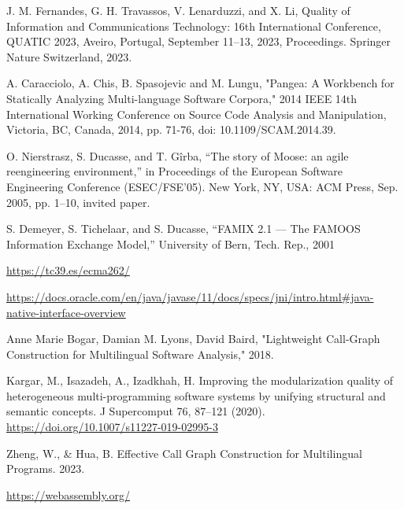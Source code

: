\begin{thebibliography}{00}
    J. M. Fernandes, G. H. Travassos, V. Lenarduzzi, and X. Li, 
    Quality of Information and Communications Technology: 
    16th International Conference, QUATIC 2023,
    Aveiro, Portugal, September 11--13, 2023,
    Proceedings. Springer Nature Switzerland, 2023.

    A. Caracciolo, A. Chis, B. Spasojevic and
    M. Lungu, "Pangea: A Workbench for Statically Analyzing Multi-language Software Corpora,"
    2014 IEEE 14th International Working Conference on Source Code Analysis
    and Manipulation, Victoria, BC, Canada, 2014,
    pp. 71-76, doi: 10.1109/SCAM.2014.39.

    O. Nierstrasz, S. Ducasse, and T. Gîrba, “The story of Moose: an
    agile reengineering environment,” in Proceedings of the European
    Software Engineering Conference (ESEC/FSE’05). New York, NY,
    USA: ACM Press, Sep. 2005, pp. 1–10, invited paper.

    S. Demeyer, S. Tichelaar, and S. Ducasse, “FAMIX 2.1 — The FAMOOS
    Information Exchange Model,” University of Bern, Tech. Rep., 2001

    \url{https://tc39.es/ecma262/}

    \url{https://docs.oracle.com/en/java/javase/11/docs/specs/jni/intro.html#java-native-interface-overview}

    Anne Marie Bogar, Damian M. Lyons, David Baird,
    "Lightweight Call-Graph Construction for Multilingual Software Analysis," 2018.

    Kargar, M., Isazadeh, A., Izadkhah, H.
    Improving the modularization quality of heterogeneous multi-programming software systems by unifying structural and semantic concepts.
    J Supercomput 76, 87–121 (2020). \url{https://doi.org/10.1007/s11227-019-02995-3}

    Zheng, W., \& Hua, B. Effective Call Graph Construction for Multilingual Programs. 2023.

    \url{https://webassembly.org/}

\end{thebibliography}
\endgroup

\clearpage
